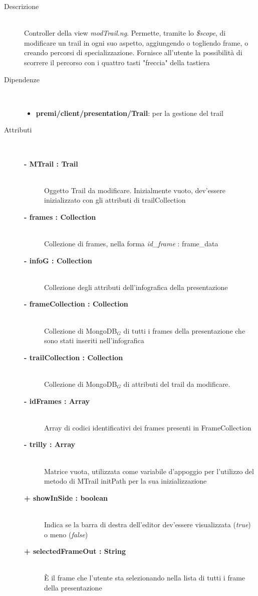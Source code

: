 \begin{description}
\item[Descrizione] \hfill \\
	Controller della view \textit{modTrail.ng}. Permette, tramite lo \textit{\$scope}, di modificare un trail in ogni suo aspetto, aggiungendo o togliendo frame, o creando percorsi di specializzazione. Fornisce all'utente la possibilità di scorrere il percorso con i quattro tasti "freccia" della tastiera
	
	
\item[Dipendenze] \hfill \\
	\begin{itemize}
		\item \textbf{premi/client/presentation/Trail}: per la gestione del trail
	\end{itemize}
	
	
\item[Attributi] \hfill \\
	\begin{description}
		\item[\textbf{- MTrail : Trail			}] \hfill \\
			Oggetto Trail da modificare. Inizialmente vuoto, dev'essere inizializzato con gli attributi di trailCollection
		\item[\textbf{- frames : Collection			}] \hfill \\
			Collezione di frames, nella forma \textit{id\_frame} : frame\_data
		\item[\textbf{- infoG : Collection			}] \hfill \\
			Collezione degli attributi dell'infografica della presentazione
		\item[\textbf{- frameCollection : Collection			}] \hfill \\
			Collezione di MongoDB$_G$ di tutti i frames della presentazione che sono stati inseriti nell'infografica
		\item[\textbf{- trailCollection : Collection			}] \hfill \\
			Collezione di MongoDB$_G$ di attributi del trail da modificare.
		\item[\textbf{- idFrames : Array			}] \hfill \\
			Array di codici identificativi dei frames presenti in FrameCollection
		\item[\textbf{- trilly : Array			}] \hfill \\
			Matrice vuota, utilizzata come variabile d'appoggio per l'utilizzo del metodo di MTrail initPath per la sua inizializzazione
		\item[\textbf{+ showInSide : boolean			}] \hfill \\
			Indica se la barra di destra dell'editor dev'essere visualizzata (\textit{true}) o meno (\textit{false})
		\item[\textbf{+ selectedFrameOut : String			}] \hfill \\
			È il frame che l'utente sta selezionando nella lista di tutti i frame della presentazione
	\end{description}
	

\end{description}
